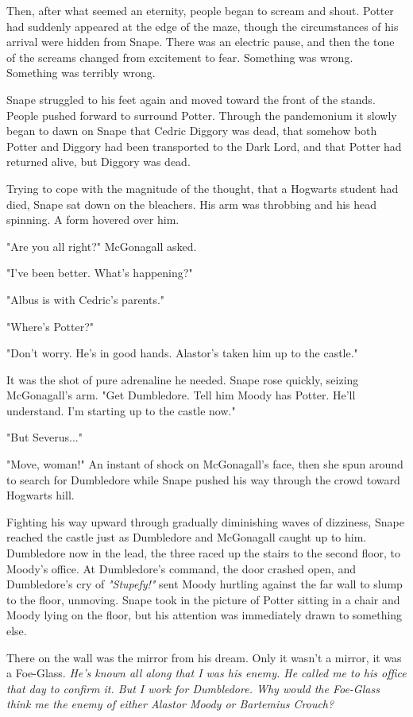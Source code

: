 \documentclass[a4paper,11pt]{article}
\begin{document}
Then, after what seemed an eternity, people began to scream and shout. Potter had suddenly appeared at the edge of the maze, though the circumstances of his arrival were hidden from Snape. There was an electric pause, and then the tone of the screams changed from excitement to fear. Something was wrong. Something was terribly wrong.

Snape struggled to his feet again and moved toward the front of the stands. People pushed forward to surround Potter. Through the pandemonium it slowly began to dawn on Snape that Cedric Diggory was dead, that somehow both Potter and Diggory had been transported to the Dark Lord, and that Potter had returned alive, but Diggory was dead.

Trying to cope with the magnitude of the thought, that a Hogwarts student had died, Snape sat down on the bleachers. His arm was throbbing and his head spinning. A form hovered over him.

"Are you all right?" McGonagall asked.

"I've been better. What's happening?"

"Albus is with Cedric's parents."

"Where's Potter?"

"Don't worry. He's in good hands. Alastor's taken him up to the castle."

It was the shot of pure adrenaline he needed. Snape rose quickly, seizing McGonagall's arm. "Get Dumbledore. Tell him Moody has Potter. He'll understand. I'm starting up to the castle now."

"But Severus..."

"Move, woman!" An instant of shock on McGonagall's face, then she spun around to search for Dumbledore while Snape pushed his way through the crowd toward Hogwarts hill.

Fighting his way upward through gradually diminishing waves of dizziness, Snape reached the castle just as Dumbledore and McGonagall caught up to him. Dumbledore now in the lead, the three raced up the stairs to the second floor, to Moody's office. At Dumbledore's command, the door crashed open, and Dumbledore's cry of \emph{"Stupefy!"} sent Moody hurtling against the far wall to slump to the floor, unmoving. Snape took in the picture of Potter sitting in a chair and Moody lying on the floor, but his attention was immediately drawn to something else.

There on the wall was the mirror from his dream. Only it wasn't a mirror, it was a Foe-Glass. \emph{He's known all along that I was his enemy. He called me to his office that day to confirm it. But I work for Dumbledore. Why would the Foe-Glass think me the enemy of either Alastor Moody or Bartemius Crouch?}
\end{document}
